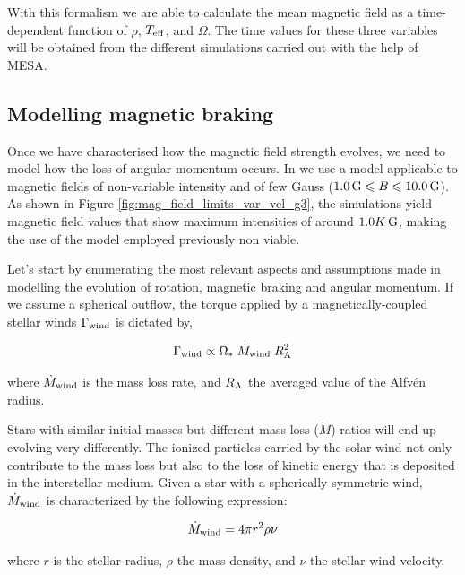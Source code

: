 \documentclass[fleqn,usenatbib]{mnras}
\begin{document}
With this formalism we are able to calculate the mean magnetic field as a time-dependent function of $\rho$, $T_{\mathrm{eff}}$, and $\Omega$. The time values for these three variables will be obtained from the different simulations carried out with the help of MESA.

\subsection{Modelling magnetic braking} \label{mod_mb}
Once we have characterised how the magnetic field strength evolves, we need to model how the loss of angular momentum occurs.  In \cite{Navarro2020} we use a model applicable to magnetic fields of non-variable intensity and of few Gauss ($1.0\,\mathrm{G} \leqslant B \leqslant 10.0\,\mathrm{G}$). As shown in Figure \ref{fig:mag_field_limits_var_vel_g3}, the simulations yield magnetic field values that show maximum intensities of around $1.0K\,\mathrm{G}$, making the use of the model employed previously non viable. \par

Let's start by enumerating the most relevant aspects and assumptions made in modelling the evolution of rotation, magnetic braking and angular momentum. If we assume a spherical outflow, the torque applied by a magnetically-coupled stellar winds $\Gamma_{\mathrm{wind}}$ is dictated by,
\begin{ceqn}
\begin{equation}
    \Gamma_{\mathrm{wind}} \propto \Omega_* \; \Dot{M}_{\mathrm{wind}} \; R_{\mathrm{A}}^{2} \label{eq:mb_torque}
\end{equation}
\end{ceqn}
where $\Dot{M}_{\mathrm{wind}}$ is the mass loss rate, and $R_{\mathrm{A}}$ the averaged value of the Alfvén radius.\par
Stars with similar initial masses but different mass loss ($\Dot{M}$) ratios will end up evolving very differently. The ionized particles carried by the solar wind not only contribute to the mass loss but also to the loss of kinetic energy that is deposited in the interstellar medium. Given a star with a spherically symmetric wind, $\Dot{M}_{\mathrm{wind}}$ is characterized by the following expression:

\begin{ceqn}
\begin{equation}
    \Dot{M}_{\mathrm{wind}} = 4\pi r^2\rho\nu \label{eq:mass_loss}
\end{equation}
\end{ceqn}
where $r$ is the stellar radius, $\rho$ the mass density, and $\nu$ the stellar wind velocity.
\end{document}
